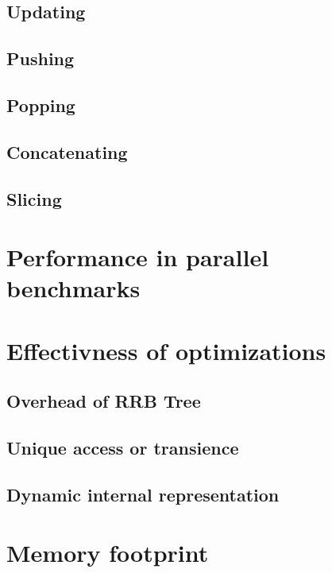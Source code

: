 \subsection{Updating}
\subsection{Pushing}
\subsection{Popping}
\subsection{Concatenating}
\subsection{Slicing}

\section{Performance in parallel benchmarks}
\section{Effectivness of optimizations}
\subsection{Overhead of RRB Tree}
\subsection{Unique access or transience}
\subsection{Dynamic internal representation}
\section{Memory footprint}
